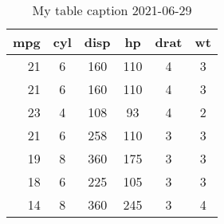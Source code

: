 \begin{table}[p]
\centering
\caption{My table caption 2021-06-29} 
\begin{tabular}{r|c|cccc}
  \hline
mpg & cyl & disp & hp & drat & wt \\ 
  \hline
21 & 6 & 160 & 110 & 4 & 3 \\ 
  21 & 6 & 160 & 110 & 4 & 3 \\ 
  23 & 4 & 108 & 93 & 4 & 2 \\ 
  21 & 6 & 258 & 110 & 3 & 3 \\ 
  19 & 8 & 360 & 175 & 3 & 3 \\ 
  18 & 6 & 225 & 105 & 3 & 3 \\ 
  14 & 8 & 360 & 245 & 3 & 4 \\ 
   \hline
\end{tabular}
\end{table}
